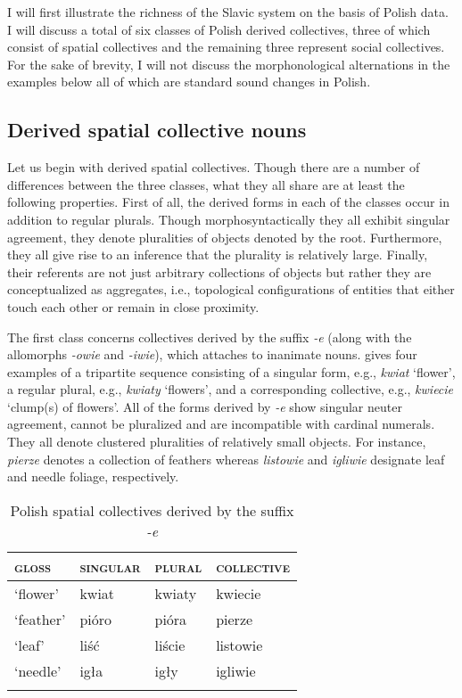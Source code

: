 \documentclass[output=paper]{langscibook}
\begin{document}
I will first illustrate the richness of the Slavic system on the basis of Polish data. I will discuss a total of six classes of Polish derived collectives, three of which consist of spatial collectives and the remaining three represent social collectives. For the sake of brevity, I will not discuss the morphonological alternations in the examples below all of which are standard sound changes in Polish.

\subsection{Derived spatial collective nouns}\label{wan:sec:derived-spatial-collective-nouns}

Let us begin with derived spatial collectives. Though there are a number of differences between the three classes, what they all share are at least the following properties. First of all, the derived forms in each of the classes occur in addition to regular plurals. Though morphosyntactically they all exhibit singular agreement, they denote pluralities of objects denoted by the root. Furthermore, they all give rise to an inference that the plurality is relatively large. Finally, their referents are not just arbitrary collections of objects but rather they are conceptualized as aggregates, i.e., topological configurations of entities that either touch each other or remain in close proximity. 

The first class concerns collectives derived by the suffix \textit{-e} (along with the allomorphs \textit{-owie} and \textit{-iwie}), which attaches to inanimate nouns.  gives four examples of a tripartite sequence consisting of a singular form, e.g., \textit{kwiat} `flower', a regular plural, e.g., \textit{kwiaty} `flowers', and a corresponding collective, e.g., \textit{kwiecie} `clump(s) of flowers'. All of the forms derived by \textit{-e} show singular neuter agreement, cannot be pluralized and are incompatible with cardinal numerals. They all denote clustered pluralities of relatively small objects. For instance, \textit{pierze} denotes a collection of feathers whereas \textit{listowie} and \textit{igliwie} designate leaf and needle foliage, respectively.

\begin{table}[h!]
\caption{Polish spatial collectives derived by the suffix \textit{-e}} 
\label{wan:tab:listowie}
 \begin{tabular}{llll} 
  \lsptoprule
           \textsc{gloss} & \textsc{singular} & \textsc{plural} & \textsc{collective} \\ 
  \midrule
  `flower'  &   kwiat &   kwiaty &    kwiecie \\
  `feather'  &   pióro &   pióra &    pierze \\
  `leaf'  &   liść &    liście  &    listowie \\
  `needle'  &   igła &    igły  &    igliwie \\
  \lspbottomrule
 \end{tabular}
\end{table}
\end{document}
